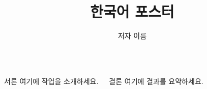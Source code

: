 \documentclass{beamer}
\title{한국어 포스터}
\author{저자 이름}
\begin{document}
\begin{frame}
\begin{columns}[t]
  \begin{block}{서론}
    여기에 작업을 소개하세요.
  \end{block}
  \begin{block}{결론}
    여기에 결과를 요약하세요.
  \end{block}
\end{columns}
\end{frame}
\end{document}
